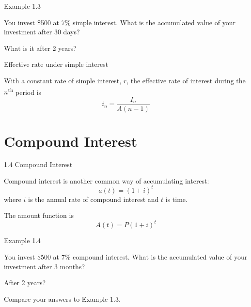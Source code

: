 \documentclass{beamer}
\begin{document}
\begin{frame}{Example 1.3}

You invest \$500 at 7\% simple interest. What is the accumulated value of your investment after 30 days?

\vspace{4em}
What is it after 2 years?

\vfill
\end{frame}

\begin{frame}{Effective rate under simple interest}

With a constant rate of simple interest, $r$, the effective rate of interest during the $n$\textsuperscript{th} period is
\[
i_n = \frac{I_n}{A(n-1)}
\]

\vfill
\end{frame}

\section{Compound Interest}

\begin{frame}{1.4 Compound Interest}

Compound interest is another common way of accumulating interest:
\[
a(t) = (1+i)^t
\]
where $i$ is the annual rate of compound interest and $t$ is time.

\bigskip
The amount function is
\[
A(t) = P(1+i)^t
\]

\end{frame}

\begin{frame}{Example 1.4}

You invest \$500 at 7\% compound interest. What is the accumulated value of your investment after 3 months?

\vspace{3em}
After 2 years?

\vspace{3em}
Compare your answers to Example 1.3.

\vfill
\end{frame}
\end{document}
